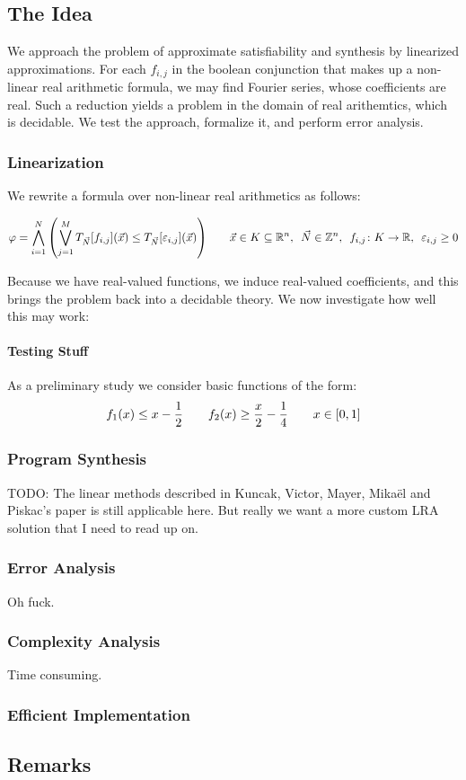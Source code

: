 \documentclass[12pt]{article}
\begin{document}
\subsection{The Idea}
We approach the problem of approximate satisfiability and synthesis
by linearized approximations.
For each $f_{i, j}$ in the boolean conjunction that makes up a
non-linear real arithmetic formula,
we may find Fourier series, whose coefficients are real.
Such a reduction yields a problem in the domain of real arithemtics, which
is decidable.
We test the approach, formalize it, and perform error analysis.

\subsubsection{Linearization}
We rewrite a formula over non-linear real arithmetics as follows:

\begin{align*}
  \varphi
    = \bigwedge_{i = 1}^{N} {\left(\bigvee_{j = 1}^{M}
      T_{\vec{N}} {\left[f_{i,j}\right]}{\left(\vec{x}\right)}
      \leq T_{\vec{N}} {\left[\varepsilon_{i,j}\right]} {\left(\vec{x}\right)}\right)}
  \qquad
  \vec{x} \in K \subseteq {\mathbb{R}}^n, \enskip
  \vec{N} \in {\mathbb{Z}}^n, \enskip
  {f_{i, j} \colon K \to {\mathbb{R}}}, \enskip
  \varepsilon_{i, j} \geq 0
\end{align*}

Because we have real-valued functions, we induce real-valued coefficients,
and this brings the problem back into a decidable theory.
We now investigate how well this may work:

\paragraph{Testing Stuff}
As a preliminary study we consider basic functions of the form:
\begin{align*}
  f_1 {\left(x\right)} \leq x - \frac{1}{2}
  \qquad
  f_2 {\left(x\right)} \geq \frac{x}{2} - \frac{1}{4}
  \qquad
  x \in {\left[0, 1\right]}
\end{align*}


\subsubsection{Program Synthesis}
TODO: The linear methods described in Kuncak, Victor, Mayer, Mika\"{e}l
and Piskac's paper is still applicable here.
But really we want a more custom LRA solution that I need to read up on.


\subsubsection{Error Analysis}
Oh fuck.

\subsubsection{Complexity Analysis}
Time consuming.

\subsubsection{Efficient Implementation}


\subsection{Remarks}



\printbibliography
\end{document}
